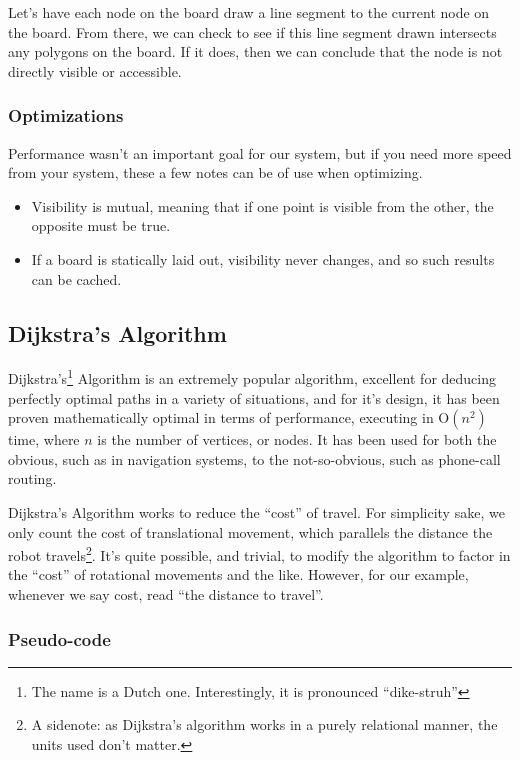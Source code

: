 \documentclass[letterpaper, 12pt]{article}
\begin{document}
\begin{multicols}{2}
Let's have each node on the board draw a line segment to the current node on the
board. From there, we can check to see if this line segment drawn intersects any
polygons on the board. If it does, then we can conclude that the node is not
directly visible or accessible.

\subsubsection{Optimizations}

Performance wasn't an important goal for our system, but if you need more speed
from your system, these a few notes can be of use when optimizing.

\begin{itemize}
    \item Visibility is mutual, meaning that if one point is visible from the
          other, the opposite must be true. \cite{wikiraytrace}
    \item If a board is statically laid out, visibility never changes, and so
          such results can be cached.
\end{itemize}

\subsection{Dijkstra's Algorithm}

Dijkstra's\footnote{The name is a Dutch one. Interestingly, it is pronounced
``dike-struh''\cite{dikestruh}} Algorithm is an extremely popular algorithm,
excellent for deducing perfectly optimal paths in a variety of situations, and
for it's design, it has been proven mathematically optimal in terms of
performance, executing in \(\mathrm{O}\!\left(n^2\right)\) time, where \(n\) is
the number of vertices, or nodes. It has been used for both the obvious, such as
in navigation systems, to the not-so-obvious, such as phone-call routing.

Dijkstra's Algorithm works to reduce the ``cost'' of travel. For simplicity
sake, we only count the cost of translational movement, which parallels the
distance the robot travels\footnote{A sidenote: as Dijkstra's algorithm works in
a purely relational manner, the units used don't matter.}. It's quite possible,
and trivial, to modify the algorithm to factor in the ``cost'' of rotational
movements and the like. However, for our example, whenever we say cost, read
``the distance to travel''.

\subsubsection{Pseudo-code}


\end{multicols}
\end{document}
